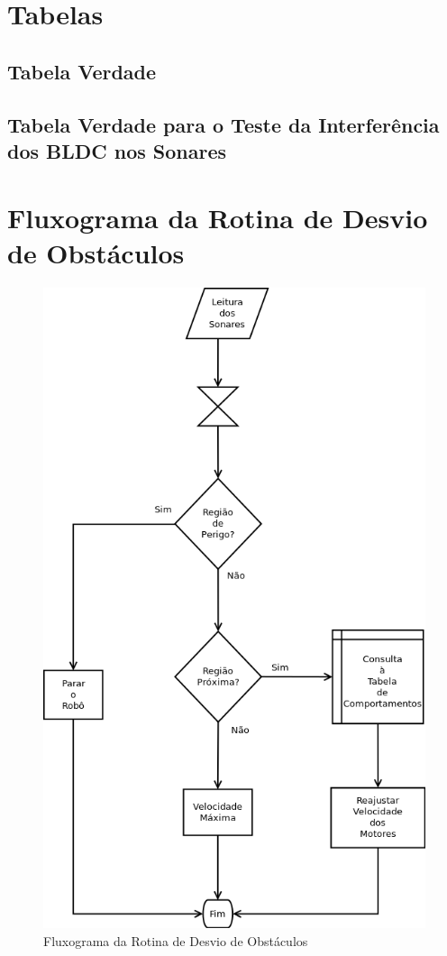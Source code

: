 \section{Tabelas} %
\subsection{Tabela Verdade}


\subsection{Tabela Verdade para o Teste da Interferência dos BLDC nos Sonares}



\section{Fluxograma da Rotina de Desvio de Obstáculos}
  \begin{figure}[!htb]
    \centering
    \includegraphics[width=0.8 \linewidth]{../../Imagens/ObstAvoid.png}
    \caption{Fluxograma da Rotina de Desvio de Obstáculos}
    \label{ObstAvoid}
  \end{figure}

